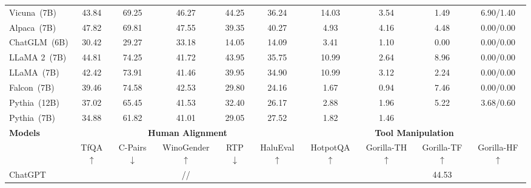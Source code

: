 \begin{table*}[htb]
{\begin{tabular}{lccccccccc}
Vicuna~(7B) & \cellcolor[HTML]{C4DDEC}43.84 & 69.25 & \cellcolor[HTML]{A7CBE2}
46.27 & \cellcolor[HTML]{A7CBE2}44.25 & \cellcolor[HTML]{C4DDEC}36.24 & \cellcolor[HTML]{A7CBE2}14.03 & \cellcolor[HTML]{C6DEED}3.54 & 1.49 & \cellcolor[HTML]{C4DDEC}
6.90/1.40\\
Alpaca~(7B) & \cellcolor[HTML]{92BFDB}47.82 & 69.81 & \cellcolor[HTML]{92BFDB}47.55 & 39.35 & \cellcolor[HTML]{92BFDB}40.27 & \cellcolor[HTML]{E5F0F7}4.93 & \cellcolor[HTML]{92BFDB}4.16 & 4.48 & 0.00/0.00\\
ChatGLM~(6B) & 30.42 & 29.27 & 33.18 & 14.05 & 14.09 & 3.41 & 1.10 & 0.00 & 0.00/0.00 \\
\midrule
LLaMA 2~(7B) & \cellcolor[HTML]{C6DEED}44.81 & \cellcolor[HTML]{A7CBE2}74.25 &41.72 & \cellcolor[HTML]{C6DEED}43.95 & \cellcolor[HTML]{E5F0F7}35.75 & \cellcolor[HTML]{C6DEED}10.99 & \cellcolor[HTML]{E5F0F7}2.64 & \cellcolor[HTML]{A7CBE2}8.96 & 0.00/0.00 \\
LLaMA~(7B) & 42.42 & \cellcolor[HTML]{C4DDEC}73.91 & 41.46 & \cellcolor[HTML]{E5F0F7}39.95 & 34.90 & \cellcolor[HTML]{C6DEED}10.99 & \cellcolor[HTML]{C4DDEC}3.12 & 2.24 & 0.00/0.00 \\
Falcon~(7B) & 39.46 & \cellcolor[HTML]{92BFDB}74.58 & \cellcolor[HTML]{E5F0F7}
42.53 & 29.80 & 24.16 & 1.67 & 0.94 & \cellcolor[HTML]{C4DDEC}
{7.46} & 0.00/0.00 \\
Pythia~(12B) & 37.02 & 65.45 & 41.53 & 32.40 & 26.17 & 2.88 & 1.96 & 5.22 & \cellcolor[HTML]{E5F0F7}3.68/0.60 \\
Pythia~(7B) & 34.88 & 61.82 & 41.01 & 29.05 & 27.52 & 1.82 & 1.46  & \cellcolor[HTML]{C4DDEC}{7.46} & \cellcolor[HTML]{C6DEED}{10.75/1.80}\\
\midrule[0.8pt]
\multirow{2.5}{*}{\textbf{Models}}  &  \multicolumn{5}{c}{\textbf{Human Alignment}} & \multicolumn{4}{c}{\textbf{Tool Manipulation}} \\
\cmidrule(r){2-6}\cmidrule(r){7-10}
& TfQA$\uparrow$ & C-Pairs$\downarrow$ & WinoGender$\uparrow$ & RTP$\downarrow$ & HaluEval$\uparrow$ & HotpotQA$\uparrow$ & Gorilla-TH$\uparrow$ & Gorilla-TF$\uparrow$ & Gorilla-HF$\uparrow$ \\
\midrule
ChatGPT & \cellcolor[HTML]{FCA77F}{69.16} & \cellcolor[HTML]{FEE8DD}{18.60} & \cellcolor[HTML]{FCA77F}{62.50}/\cellcolor[HTML]{FCA77F}{72.50}/\cellcolor[HTML]{FCA77F}{79.17} & \cellcolor[HTML]{FC8D59}{3.07} & \cellcolor[HTML]{FC8D59}{66.64} & \cellcolor[HTML]{FEF7F3}{23.80} & \cellcolor[HTML]{FCA77F}{67.20} & \cellcolor[HTML]{FC8D59}
{44.53} & \cellcolor[HTML]{FCA77F}{19.36}\\

\end{tabular}}
\end{table*}
